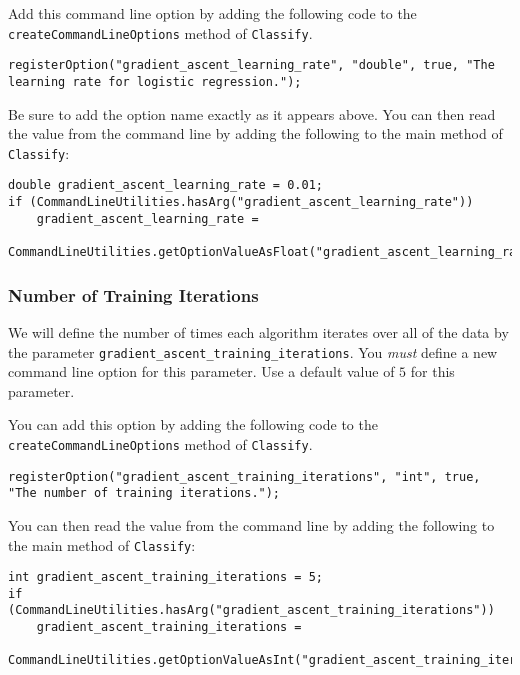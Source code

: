 \documentclass[11pt]{article}
\newcommand{\code}[1]{{\footnotesize \tt #1}}
\begin{document}
Add this command line option by adding the following code to the \code{createCommandLineOptions} method of \code{Classify}.
\begin{footnotesize}
\begin{verbatim}
registerOption("gradient_ascent_learning_rate", "double", true, "The learning rate for logistic regression.");
\end{verbatim}
\end{footnotesize}

Be sure to add the option name exactly as it appears above. 
You can then read the value from the command line by adding the following to the main method of \code{Classify}:
\begin{footnotesize}
\begin{verbatim}
double gradient_ascent_learning_rate = 0.01;
if (CommandLineUtilities.hasArg("gradient_ascent_learning_rate"))
    gradient_ascent_learning_rate = 
        CommandLineUtilities.getOptionValueAsFloat("gradient_ascent_learning_rate");
\end{verbatim}
\end{footnotesize}




\subsubsection{Number of Training Iterations}
\label{sec:iterations}

We will define the number of times each algorithm iterates over all of the data by the parameter \code{gradient\_ascent\_training\_iterations}. You \emph{must} define a new command line option for this parameter. Use a default value of $5$ for this parameter.

You can add this option by adding the following code to the \code{createCommandLineOptions} method of \code{Classify}.
\begin{footnotesize}
\begin{verbatim}
registerOption("gradient_ascent_training_iterations", "int", true, "The number of training iterations.");
\end{verbatim}
\end{footnotesize}


You can then read the value from the command line by adding the following to the main method of \code{Classify}:
\begin{footnotesize}
\begin{verbatim}
int gradient_ascent_training_iterations = 5;
if (CommandLineUtilities.hasArg("gradient_ascent_training_iterations"))
    gradient_ascent_training_iterations = 
         CommandLineUtilities.getOptionValueAsInt("gradient_ascent_training_iterations");
\end{verbatim}
\end{footnotesize}
\end{document}
